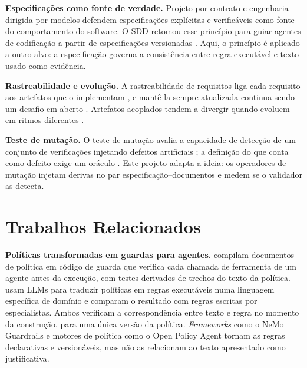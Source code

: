 \documentclass[12pt]{article}
\begin{document}
\textbf{Especificações como fonte de verdade.} Projeto por contrato \cite{meyer1992dbc} e engenharia dirigida por modelos \cite{schmidt2006mde} defendem especificações explícitas e verificáveis como fonte do comportamento do software. O SDD retomou esse princípio para guiar agentes de codificação a partir de especificações versionadas \cite{githubspeckit2025}. Aqui, o princípio é aplicado a outro alvo: a especificação governa a consistência entre regra executável e texto usado como evidência.

\textbf{Rastreabilidade e evolução.} A rastreabilidade de requisitos liga cada requisito aos artefatos que o implementam \cite{gotel1994traceability,ramesh2001traceability}, e mantê-la sempre atualizada continua sendo um desafio em aberto \cite{clelandhuang2014traceability}. Artefatos acoplados tendem a divergir quando evoluem em ritmos diferentes \cite{lehman1980laws,zaidman2011coevolution}.

\textbf{Teste de mutação.} O teste de mutação avalia a capacidade de detecção de um conjunto de verificações injetando defeitos artificiais \cite{demillo1978hints,jia2011mutation,papadakis2019mutation}; a definição do que conta como defeito exige um oráculo \cite{barr2015oracle}. Este projeto adapta a ideia: os operadores de mutação injetam derivas no par especificação--documentos e medem se o validador as detecta.

\section{Trabalhos Relacionados}
\label{sec3:trab_rel}

\textbf{Políticas transformadas em guardas para agentes.} \cite{zwerdling2025policy} compilam documentos de política em código de guarda que verifica cada chamada de ferramenta de um agente antes da execução, com testes derivados de trechos do texto da política. \cite{datla2025executable} usam LLMs para traduzir políticas em regras executáveis numa linguagem específica de domínio e comparam o resultado com regras escritas por especialistas. Ambos verificam a correspondência entre texto e regra no momento da construção, para uma única versão da política. \textit{Frameworks} como o NeMo Guardrails \cite{rebedea2023nemo} e motores de política como o Open Policy Agent \cite{opa} tornam as regras declarativas e versionáveis, mas não as relacionam ao texto apresentado como justificativa.
\end{document}

